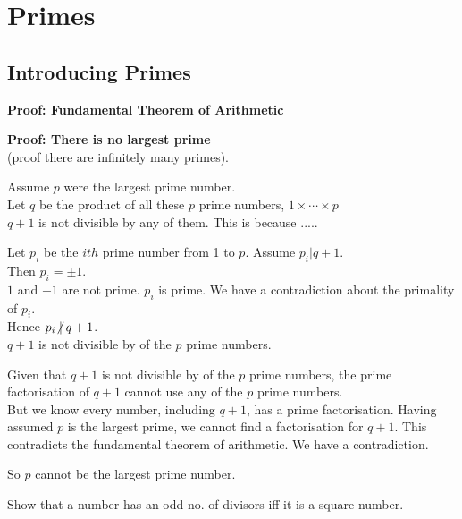 
\chapter{Primes}

\section{Introducing Primes}


\textbf{Proof: Fundamental Theorem of Arithmetic} \\


\frmrule



\textbf{Proof: There is no largest prime} \\
(proof there are infinitely many primes). 

Assume $p$ were the largest prime number.\\
Let $q$ be the product of all these $p$ prime numbers, $1 \times \cdots \times p$\\

$q + 1$ is not divisible by any of them. This is because .....	

\frmrule

Let $p_i$ be the $ith$ prime number from 1 to $p$. 
Assume $p_i | q + 1$. \\
Then $p_i = \pm 1$. \\
$1$ and $-1$ are not prime. $p_i$ is prime. We have a contradiction about the primality of $p_i$. \\
Hence $p_i \centernot\mid q + 1$. \\
$q + 1$ is not divisible by of the $p$ prime numbers.

\frmrule

Given that $q + 1$ is not divisible by of the $p$ prime numbers, 
the prime factorisation of $q + 1$ cannot use any of the $p$ prime numbers. \\
But we know every number, including $q + 1$, has a prime factorisation. 
Having assumed $p$ is the largest prime, we cannot find a factorisation 
for $q + 1$. This contradicts the fundamental theorem of arithmetic. 
We have a contradiction.

So $p$ cannot be the largest prime number. 


\frmrule



\begin{example}
Show that a number has an odd no. of divisors iff it is a square number. 
\end{example}

\frmrule